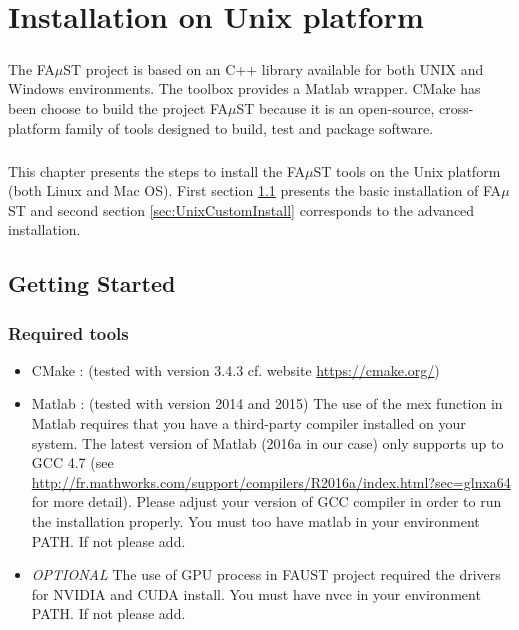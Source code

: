 \chapter{Installation on Unix platform}\label{sec:InstallUnix}

\paragraph{}The FA$\mu$ST project is based on an C++ library available for both UNIX and Windows environments. The toolbox provides a Matlab wrapper. CMake has been choose to build the project FA$\mu$ST because it is an open-source, cross-platform family of tools designed to build, test and package software.

\paragraph{}This chapter presents the steps to install the FA$\mu$ST tools on the Unix platform (both Linux and Mac OS). First section \ref{sec:UnixGettingStarted} presents the basic installation of FA$\mu$ST and second section \ref{sec:UnixCustomInstall} corresponds to the advanced  installation.

\section{Getting Started}\label{sec:UnixGettingStarted}

\subsection{Required tools}\label{sec:RequiredTools}

\begin{itemize}
\item CMake : (tested with version 3.4.3 cf. website \url{https://cmake.org/})
\item Matlab : (tested with version 2014 and 2015)
The use of the mex function in Matlab requires that you have a third-party compiler installed on your system. The latest version of Matlab (2016a in our case) only supports up to GCC 4.7 (see \url{http://fr.mathworks.com/support/compilers/R2016a/index.html?sec=glnxa64} for more detail). Please adjust your version of GCC compiler in order to run the installation properly. 
You must too have matlab in your environment PATH. If not please add. 

\item \textit{OPTIONAL} The use of GPU process in FAUST project required the drivers for NVIDIA and CUDA install. You must have nvcc in your environment PATH. If not please add.
\end{itemize}

